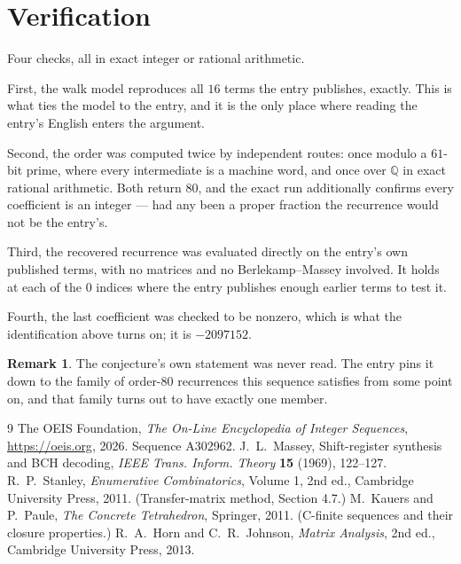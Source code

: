\documentclass[11pt,a4paper]{article}
\theoremstyle{plain}
\theoremstyle{definition}
\newtheorem{remark}[theorem]{Remark}
\begin{document}
\section{Verification}

Four checks, all in exact integer or rational arithmetic.

First, the walk model reproduces all $16$ terms the entry publishes, exactly. This is
what ties the model to the entry, and it is the only place where reading the entry's English
enters the argument.

Second, the order was computed twice by independent routes: once modulo a $61$-bit prime, where
every intermediate is a machine word, and once over $\mathbb{Q}$ in exact rational arithmetic.
Both return $80$, and the exact run additionally confirms every coefficient is an integer
--- had any been a proper fraction the recurrence would not be the entry's.

Third, the recovered recurrence was evaluated directly on the entry's own published terms, with
no matrices and no Berlekamp--Massey involved. It holds at each of the $0$ indices where
the entry publishes enough earlier terms to test it.

Fourth, the last coefficient was checked to be nonzero, which is what the identification above
turns on; it is $-2097152$.

\begin{remark}
The conjecture's own statement was never read. The entry pins it down to the family of
order-$80$ recurrences this sequence satisfies from some point on, and that family turns
out to have exactly one member.
\end{remark}

\begin{thebibliography}{9}
 The OEIS Foundation, \emph{The On-Line Encyclopedia of Integer
Sequences}, \url{https://oeis.org}, 2026. Sequence A302962.
 J.~L.~Massey, Shift-register synthesis and BCH decoding, \emph{IEEE
Trans. Inform. Theory} \textbf{15} (1969), 122--127.
 R.~P.~Stanley, \emph{Enumerative Combinatorics}, Volume 1, 2nd ed.,
Cambridge University Press, 2011. (Transfer-matrix method, Section 4.7.)
 M.~Kauers and P.~Paule, \emph{The Concrete Tetrahedron}, Springer, 2011.
(C-finite sequences and their closure properties.)
 R.~A.~Horn and C.~R.~Johnson, \emph{Matrix Analysis}, 2nd ed., Cambridge
University Press, 2013.
\end{thebibliography}
\end{document}
